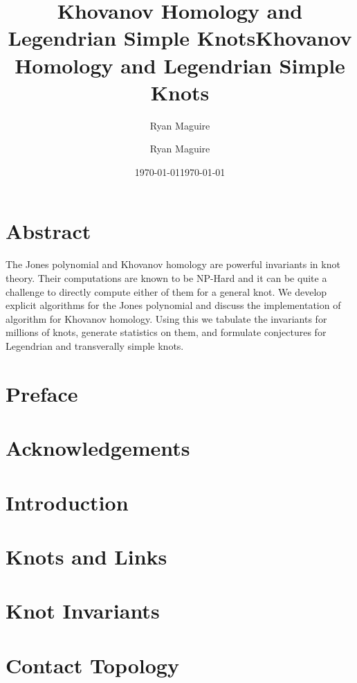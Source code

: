 \documentclass{dcthesis}
\title{Khovanov Homology and Legendrian Simple Knots}
\author{Ryan Maguire}
\date{\today}
\title{Khovanov Homology and Legendrian Simple Knots}
\author{Ryan Maguire}
\date{\today}
\theoremstyle{plain}
\theoremstyle{normal}
\begin{document}
    \frontmatter
    \maketitle
    \chapter*{Abstract}
        The Jones polynomial and Khovanov homology are powerful invariants
        in knot theory. Their computations are known to be NP-Hard and it
        can be quite a challenge to directly compute either of them for a
        general knot. We develop explicit algorithms for the Jones polynomial
        and discuss the implementation of algorithm for Khovanov homology.
        Using this we tabulate the invariants for millions of knots, generate
        statistics on them, and formulate conjectures for Legendrian and
        transverally simple knots.
    \chapter*{Preface}
        
    \chapter*{Acknowledgements}
        
    \tableofcontents
    \listoftables
    \listoffigures
    \mainmatter
    \chapter{Introduction}
        
    \chapter{Knots and Links}
        
        
        
        
    \chapter{Knot Invariants}
        
        
        
        
        
    \chapter{Contact Topology}
        
        
        
        
\end{document}

